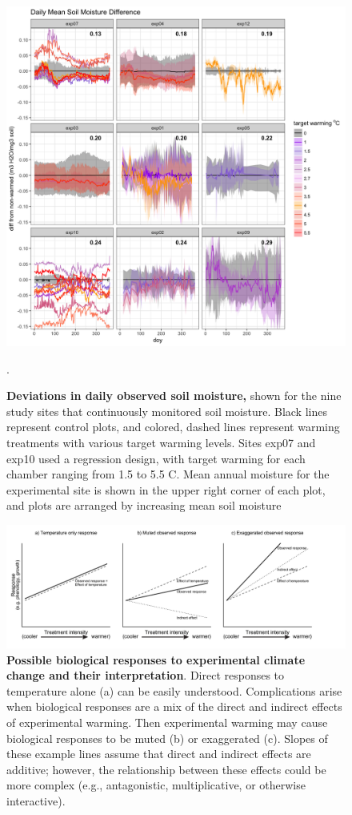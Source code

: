 \documentclass{article}
\begin{document}
 \begin{figure}[h]
    \centering
 \includegraphics{../Analyses/figures/Exploratory_TimeSeries_SoilMoist_Deviation.png}  
 \caption{\textbf{Deviations in daily observed soil moisture,} shown for the nine  study sites that continuously monitored soil moisture. Black lines represent control plots, and colored, dashed lines represent warming treatments with various target warming levels. Sites exp07 and exp10 used a regression design, with target warming for each chamber ranging from 1.5 to 5.5 \degree C. Mean annual moisture for the experimental site is shown in the upper right corner of each plot, and plots are arranged by increasing mean soil moisture}. %
 \label{fig:mois}
 \end{figure}
 \begin{figure}[h]
 \includegraphics{../Analyses/figures/DirIndWarmingEffects.pdf} 
 \caption{\textbf{Possible biological responses to experimental climate change and their interpretation}. Direct responses to temperature alone (a) can be easily understood. Complications arise when biological responses are a mix of the direct and indirect effects of experimental warming. Then experimental warming may cause biological responses to be muted (b) or exaggerated (c). Slopes of these example lines assume that direct and indirect effects are additive; however, the relationship between these effects could be more complex (e.g., antagonistic, multiplicative, or otherwise interactive).} 
\label{fig:biolimp}
  \end{figure}
\end{document}
